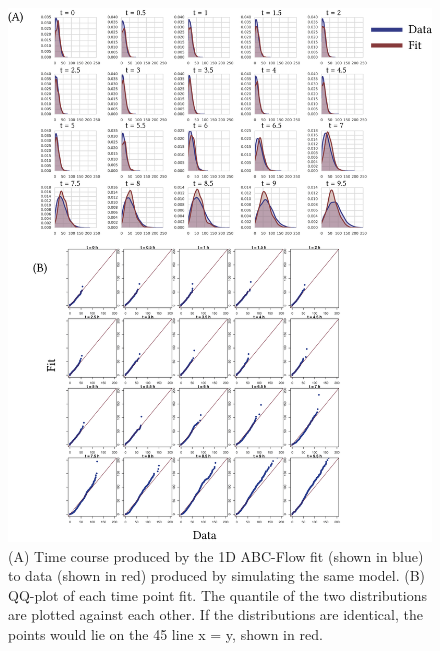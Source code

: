 
\begin{figure}[htbp]
\centering
	\includegraphics[scale=0.9]{../../chapters/chapterABCFlow/images/1D_sim_res.png}
	\caption[ABC-Flow parameter inference for 1D simulated data]{\label{fig:1d-sim-res} (A) Time course produced by the 1D ABC-Flow fit (shown in blue) to data (shown in red) produced by simulating the same model. (B) QQ-plot of each time point fit. The quantile of the two distributions are plotted against each other. If the distributions are identical, the points would lie on the 45\textdegree{} line x = y, shown in red. }
\end{figure}






